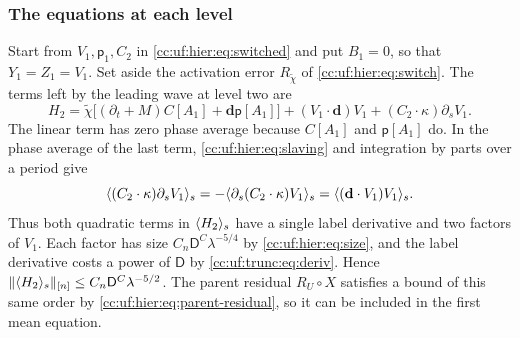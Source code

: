 \subsubsection{The equations at each level}

Start from $V_1,\mathsf p_1,C_2$ in
\eqref{cc:uf:hier:eq:switched} and put $B_1=0$, so that $Y_1=Z_1=V_1$.
Set aside the activation error $R_{\widetilde\chi}$ of
\eqref{cc:uf:hier:eq:switch}. The terms left by the leading wave at level
two are
\begin{equation}\label{cc:uf:hier:eq:H2}
 H_2=\widetilde\chi\bigl[(\partial_t+M)C[A_1]+\mathbf d\mathsf p[A_1]\bigr]
   +(V_1\cdot\mathbf d)V_1+(C_2\cdot\kappa)\partial_sV_1 .
\end{equation}
The linear term has zero phase average because $C[A_1]$ and
$\mathsf p[A_1]$ do. In the phase average of the last term,
\eqref{cc:uf:hier:eq:slaving} and integration by parts over a period give
\[
 \langle (C_2\cdot\kappa)\partial_sV_1\rangle_s
 =-\langle \partial_s(C_2\cdot\kappa)V_1\rangle_s
 =\langle (\mathbf d\cdot V_1)V_1\rangle_s.
\]
Thus both quadratic terms in $\langle H_2\rangle_s$ have a single label
derivative and two factors of $V_1$. Each factor has size
$C_n\mathsf D^C\lambda^{-5/4}$ by \eqref{cc:uf:hier:eq:size}, and the
label derivative costs a power of $\mathsf D$ by \eqref{cc:uf:trunc:eq:deriv}.
Hence $\|\langle H_2\rangle_s\|_{[n]}\le C_n\mathsf D^C\lambda^{-5/2}$.
The parent residual $R_U\circ X$ satisfies a bound of this same order by
\eqref{cc:uf:hier:eq:parent-residual}, so it can be included in the
first mean equation.

